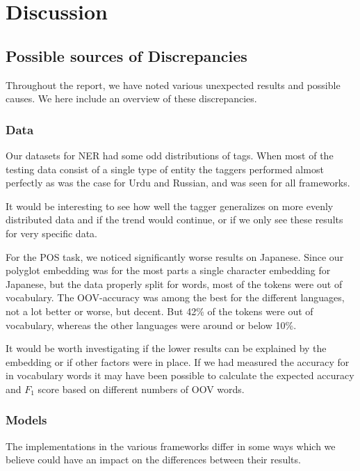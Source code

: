 
\section{Discussion}

\subsection{Possible sources of Discrepancies}

Throughout the report, we have noted various unexpected results and possible
causes. We here include an overview of these discrepancies.

\subsubsection{Data}

Our datasets for NER had some odd distributions of tags. When most of the
testing data consist of a single type of entity the taggers performed almost
perfectly as was the case for Urdu and Russian, and was seen for all frameworks.

It would be interesting to see how well the tagger generalizes on more evenly
distributed data and if the trend would continue, or if we only see these
results for very specific data.

For the POS task, we noticed significantly worse results on Japanese. Since our
polyglot embedding was for the most parts a single character embedding for
Japanese, but the data properly split for words, most of the tokens were out of
vocabulary. The OOV-accuracy was among the best for the different languages, not
a lot better or worse, but decent. But 42\% of the tokens were out of
vocabulary, whereas the other languages were around or below 10\%.

It would be worth investigating if the lower results can be explained by the
embedding or if other factors were in place. If we had measured the accuracy for
in vocabulary words it may have been possible to calculate the expected accuracy
and $F_1$ score based on different numbers of OOV words.

\subsubsection{Models}\label{sec:discuss_models}

The implementations in the various frameworks differ in some ways which we
believe could have an impact on the differences between their results. 


